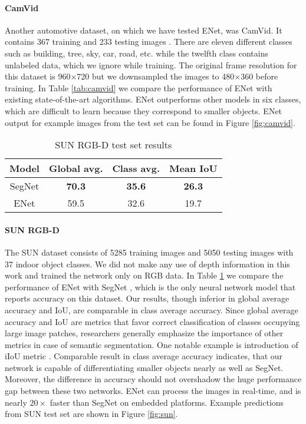 \documentclass{article}
\begin{document}
\paragraph{CamVid}

Another automotive dataset, on which we have tested ENet, was CamVid.
It contains 367 training and 233 testing images \cite{camvid08}.
There are eleven different classes such as building, tree, sky, car, road, etc. while the twelfth class contains unlabeled data, which we ignore while training.
The original frame resolution for this dataset is 960$\times$720 but we downsampled the images to 480$\times$360 before training.
In Table \ref{tab:camvid} we compare the performance of ENet with existing state-of-the-art algorithms.
ENet outperforms other models in six classes, which are difficult to learn because they correspond to smaller objects.
ENet output for example images from the test set can be found in Figure \ref{fig:camvid}.

\begin{table}[htb]
  \small
  \caption{SUN RGB-D test set results}
  \vspace{0.05in}
  \label{tab:sun1}
  \centering
  \begin{tabular}{ c c c c }
    \toprule
    Model           &Global avg.      &Class avg.     &Mean IoU    \\
    \midrule
    SegNet          &\textbf{70.3}    &\textbf{35.6}  &\textbf{26.3}\\
    ENet            &59.5             &32.6           &19.7         \\
    \bottomrule
  \end{tabular}

\end{table}

\paragraph{SUN RGB-D}
The SUN dataset consists of 5285 training images and 5050 testing images with 37 indoor object classes.
We did not make any use of depth information in this work and trained the network only on RGB data.
In Table \ref{tab:sun1} we compare the performance of ENet with SegNet \cite{badrinarayanan15}, which is the only neural network model that reports accuracy on this dataset.
Our results, though inferior in global average accuracy and IoU, are comparable in class average accuracy.
Since global average accuracy and IoU are metrics that favor correct classification of classes occupying large image patches, researchers generally emphasize the importance of other metrics in case of semantic segmentation.
One notable example is introduction of iIoU metric \cite{cityscape2016}.
Comparable result in class average accuracy indicates, that our network is capable of differentiating smaller objects nearly as well as SegNet.
Moreover, the difference in accuracy should not overshadow the huge performance gap between these two networks.
ENet can process the images in real-time, and is nearly $20 \times$ faster than SegNet on embedded platforms.
Example predictions from SUN test set are shown in Figure \ref{fig:sun}.
\end{document}

